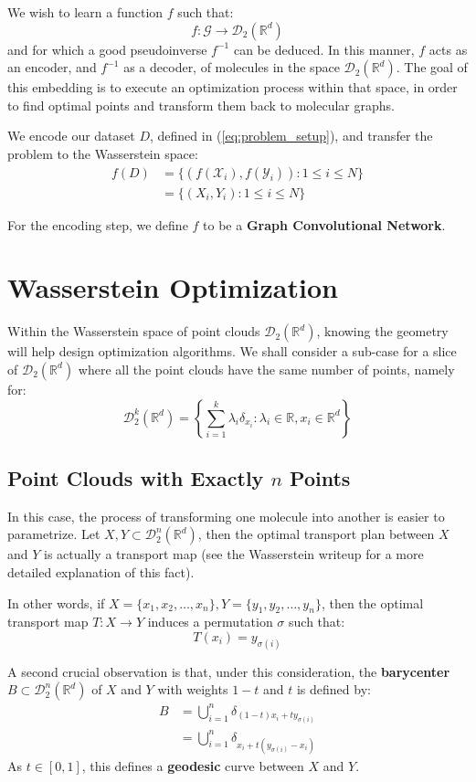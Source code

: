 \documentclass{article}
\begin{document}
We wish to learn a function $f$ such that:
\[ f:\mathcal{G}\rightarrow \mathscr{D}_2({\mathbb{R}^d}) \] 
and for which a good pseudoinverse $f^{-1}$ can be deduced. In this manner, $f$ acts as an encoder, and $f^{-1}$ as a decoder, of molecules in the space $\mathscr{D}_2({\mathbb{R}^d})$. The goal of this embedding is to execute an optimization process within that space, in order to find optimal points and transform them back to molecular graphs.

We encode our dataset $D$, defined in (\ref{eq:problem_setup}), and transfer the problem to the Wasserstein space:
\begin{align*}
    f(D) &= \{(f(\mathcal{X}_i), f(\mathcal{Y}_i)) : 1\leq i\leq N\}\\
    &= \{(X_i, Y_i) : 1\leq i\leq N\}
\end{align*}

For the encoding step, we define $f$ to be a \textbf{Graph Convolutional Network}.

\section{Wasserstein Optimization}

Within the Wasserstein space of point clouds $\mathscr{D}_2({\mathbb{R}^d})$,
knowing the geometry will help design optimization algorithms. We shall consider a sub-case for a slice of $\mathscr{D}_2({\mathbb{R}^d})$ where all the point clouds have the same number of points, namely for:
\[\mathscr{D}^k_2({\mathbb{R}^d}) = \left\{\sum_{i=1}^{k}\lambda_i\delta_{x_i} : \lambda_i\in\mathbb{R}, x_i\in {\mathbb{R}^d} \right\} \]

\subsection{Point Clouds with Exactly $n$ Points}
In this case, the process of transforming one molecule into another is easier to parametrize. Let $X,Y\subset \mathscr{D}^n_2({\mathbb{R}^d})$, then the optimal transport plan between $X$ and $Y$ is actually a transport map (see the Wasserstein writeup for a more detailed explanation of this fact).

In other words, if $X = \{x_1, x_2, \dots , x_n\}, Y = \{y_1, y_2, \dots , y_n\}$, then the optimal transport map $T : X\rightarrow Y$ induces a permutation $\sigma$ such that:
\[T(x_i) = y_{\sigma(i)} \]

A second crucial observation is that, under this consideration, the \textbf{barycenter} $B\subset \mathscr{D}^n_2({\mathbb{R}^d})$ of $X$ and $Y$ with weights $1-t$ and $t$ is defined by:
\begin{align*}
    B &= \bigcup_{i=1}^{n}\delta_{(1-t)x_i + ty_{\sigma(i)}} \\
      &= \bigcup_{i=1}^{n}\delta_{x_i + t(y_{\sigma(i)} - x_i)}
\end{align*}
As $t\in [0,1]$, this defines a \textbf{geodesic} curve between $X$ and $Y$.
\end{document}
